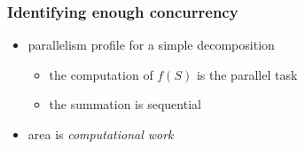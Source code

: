 %
%
%
%


\begin{frame}[fragile]
%
  \frametitle{Identifying enough concurrency}
%
  \begin{itemize}
%
  \item parallelism profile for a simple decomposition
    \begin{itemize}
    \item the computation of $f(S)$ is the parallel task
    \item the summation is sequential
    \end{itemize}
%
  \item area is {\em computational work}


\end{itemize}
\end{frame}
